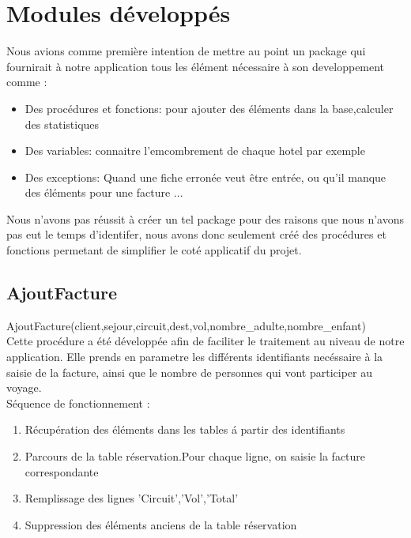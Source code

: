 \section{Modules d\'evelopp\'es}
Nous avions comme premi\`ere intention de mettre au point un package qui fournirait \`a notre application tous les \'el\'ement n\'ecessaire \`a son developpement comme :

\begin{itemize}
\item Des proc\'edures et fonctions: pour ajouter des \'el\'ements dans la base,calculer des statistiques
\item Des variables: connaitre l'emcombrement de chaque hotel par exemple
\item Des exceptions: Quand une fiche erron\'ee veut \^etre entr\'ee, ou qu'il manque des \'el\'ements pour une facture ...
\end{itemize}

Nous n'avons pas r\'eussit \`a cr\'eer un tel package pour des raisons que nous n'avons pas eut le temps d'identifer, nous avons donc seulement cr\'e\'e des proc\'edures et fonctions permetant de simplifier le cot\'e applicatif du projet.

\subsection{AjoutFacture}

AjoutFacture(client,sejour,circuit,dest,vol,nombre\_adulte,nombre\_enfant)\\
Cette proc\'edure a \'et\'e d\'evelopp\'ee afin de faciliter le traitement au niveau de notre application.
Elle prends en parametre les diff\'erents identifiants nec\'essaire \`a la saisie de la facture, ainsi que le nombre de personnes qui vont participer au voyage.\\

S\'equence de fonctionnement :
\begin{enumerate}[1]
\item R\'ecup\'eration des \'el\'ements dans les tables \'a partir des identifiants
\item Parcours de la table r\'eservation.Pour chaque ligne, on saisie la facture correspondante
\item Remplissage des lignes 'Circuit','Vol','Total'
\item Suppression des \'el\'ements anciens de la table r\'eservation

\end{enumerate}

